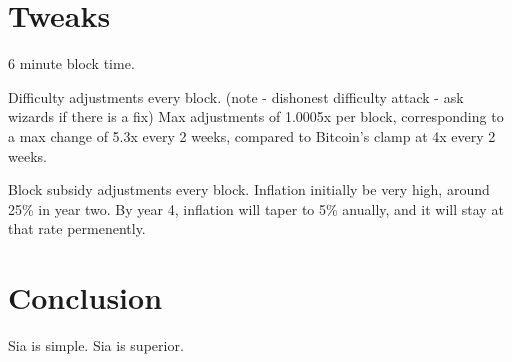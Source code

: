 \documentclass[twocolumn]{article}
\begin{document}
\section{Tweaks}
6 minute block time.

Difficulty adjustments every block. (note - dishonest difficulty attack - ask wizards if there is a fix)
Max adjustments of 1.0005x per block, corresponding to a max change of 5.3x every 2 weeks, compared to Bitcoin's clamp at 4x every 2 weeks.

Block subsidy adjustments every block.
Inflation initially be very high, around 25\% in year two.
By year 4, inflation will taper to 5\% anually, and it will stay at that rate permenently.

\section{Conclusion}
Sia is simple. Sia is superior.



\end{document}
